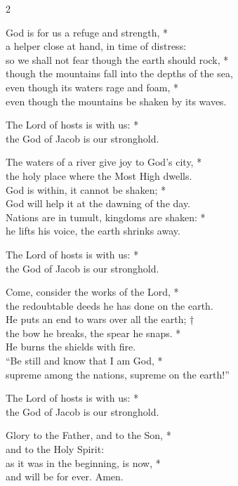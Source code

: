 \begin{multicols}{2}
 
God is for us a refuge and strength, *\\
a helper close at hand, in time of distress:\\
so we shall not fear though the earth should rock, *\\
though the mountains fall into the depths of the sea,\\
even though its waters rage and foam, *\\
even though the mountains be shaken by its waves.

The Lord of hosts is with us: *\\
the God of Jacob is our stronghold.

The waters of a river give joy to God’s city, *\\
the holy place where the Most High dwells.\\
God is within, it cannot be shaken; *\\
God will help it at the dawning of the day.\\
Nations are in tumult, kingdoms are shaken: *\\
he lifts his voice, the earth shrinks away.

The Lord of hosts is with us: *\\
the God of Jacob is our stronghold.

Come, consider the works of the Lord, *\\
the redoubtable deeds he has done on the earth.\\
He puts an end to wars over all the earth; †\\
the bow he breaks, the spear he snaps. *\\
He burns the shields with fire.\\
“Be still and know that I am God, *\\
supreme among the nations, supreme on the earth!”

The Lord of hosts is with us: *\\
the God of Jacob is our stronghold.

Glory to the Father, and to the Son, *\\
and to the Holy Spirit:\\
as it was in the beginning, is now, *\\
and will be for ever. Amen.

\end{multicols}
